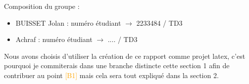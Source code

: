 Composition du groupe :
\begin{itemize}
    \item BUISSET Jolan : numéro étudiant $\rightarrow$ 2233484 / TD3
    \item Achraf : numéro étudiant $\rightarrow$ .... / TD3
\end{itemize}
Nous avons choisis d'utiliser la création de ce rapport comme projet latex, c'est pourquoi je commiterais dans une branche distincte cette section 1 afin de contribuer au point \textcolor{orange}{[B1]} mais cela sera tout expliqué dans la section 2.
